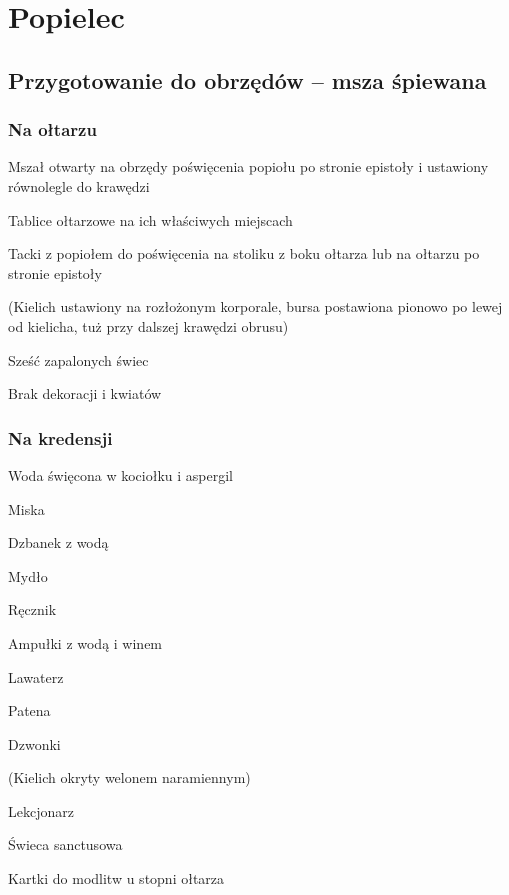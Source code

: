 \chapter{Popielec}

\begin{paracol}{2}
	\section{Przygotowanie do obrzędów -- msza śpiewana}

	\subsection{Na ołtarzu}

	\begin{itemize*}
		\item Mszał otwarty na obrzędy poświęcenia popiołu po stronie epistoły i
		ustawiony równolegle do krawędzi
		\item Tablice ołtarzowe na ich właściwych miejscach
		\item Tacki z popiołem do poświęcenia na stoliku z boku ołtarza lub na
		ołtarzu po stronie epistoły
		\item (Kielich ustawiony na rozłożonym korporale, bursa postawiona
		      pionowo po lewej od kielicha, tuż przy dalszej krawędzi obrusu)
		\item Sześć zapalonych świec
		\item Brak dekoracji i kwiatów
	\end{itemize*}

	\subsection{Na kredensji}

	\begin{itemize*}
		\item Woda święcona w kociołku i aspergil
		\item Miska
		\item Dzbanek z wodą
		\item Mydło
		\item Ręcznik
		\item Ampułki z wodą i winem
		\item Lawaterz
		\item Patena
		\item Dzwonki
		\item (Kielich okryty welonem naramiennym)
		\item Lekcjonarz
		\item Świeca sanctusowa
		\item Kartki do modlitw u stopni ołtarza
	\end{itemize*}


\end{paracol}
